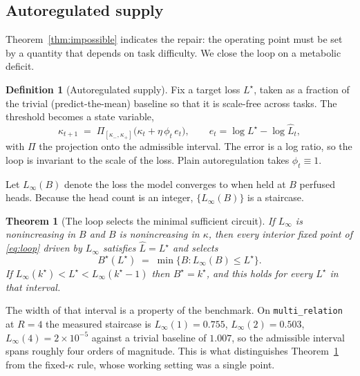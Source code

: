 \documentclass[11pt]{report}
\theoremstyle{plain}
\newtheorem{theorem}[proposition]{Theorem}
\theoremstyle{definition}
\newtheorem{definition}[proposition]{Definition}
\theoremstyle{remark}
\begin{document}
\subsection{Autoregulated supply}

Theorem~\ref{thm:impossible} indicates the repair: the operating point must be set by a
quantity that depends on task difficulty. We close the loop on a metabolic deficit.

\begin{definition}[Autoregulated supply]
\label{def:autoreg}
Fix a target loss $L^\star$, taken as a fraction of the trivial (predict-the-mean)
baseline so that it is scale-free across tasks. The threshold becomes a state variable,
\begin{equation}
  \label{eq:loop}
  \kappa_{t+1} \;=\; \Pi_{[\kappa_-,\kappa_+]}\!\bigl(\kappa_t + \eta\,\phi_t\,e_t\bigr),
  \qquad e_t = \log L^\star - \log \widehat L_t ,
\end{equation}
with $\Pi$ the projection onto the admissible interval. The error is a log ratio, so the
loop is invariant to the scale of the loss. Plain autoregulation takes $\phi_t \equiv 1$.
\end{definition}

Let $L_\infty(B)$ denote the loss the model converges to when held at $B$ perfused heads.
Because the head count is an integer, $\{L_\infty(B)\}$ is a staircase.

\begin{theorem}[The loop selects the minimal sufficient circuit]
\label{thm:autoreg}
If $L_\infty$ is nonincreasing in $B$ and $B$ is nonincreasing in $\kappa$, then every
interior fixed point of \eqref{eq:loop} driven by $L_\infty$ satisfies
$\widehat L = L^\star$ and selects
\begin{equation}
  B^\star(L^\star) \;=\; \min\{B : L_\infty(B) \le L^\star\}.
\end{equation}
If $L_\infty(k^\star) < L^\star < L_\infty(k^\star - 1)$ then $B^\star = k^\star$, and
this holds for \emph{every} $L^\star$ in that interval.
\end{theorem}

The width of that interval is a property of the benchmark. On \texttt{multi\_relation} at
$R = 4$ the measured staircase is $L_\infty(1) = 0.755$, $L_\infty(2) = 0.503$,
$L_\infty(4) = 2\times 10^{-5}$ against a trivial baseline of $1.007$, so the admissible
interval spans roughly four orders of magnitude. This is what distinguishes
Theorem~\ref{thm:autoreg} from the fixed-$\kappa$ rule, whose working setting was a single
point.
\end{document}
